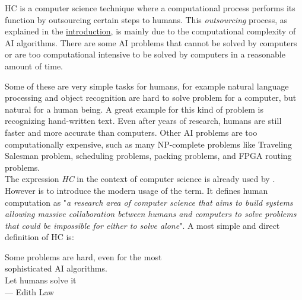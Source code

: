 
\acf{HC} is a computer science technique where a computational process
performs its function by outsourcing certain steps to humans. This
\emph{outsourcing} process, as explained in the \hyperref[intro]{introduction},
is mainly due to the computational complexity of \ac{AI} algorithms. There are
some \ac{AI} problems that cannot be solved by computers or are too computational
intensive to be solved by computers in a reasonable amount of time.

Some of these are very simple tasks for humans, for example natural language
processing and object recognition are hard to solve problem for a computer,
but natural for a human being. A great example for this kind of problem
is recognizing hand-written text. Even after years of research,
humans are still faster and more accurate than computers. Other \ac{AI} problems
are too computationally expensive, such as many NP-complete problems like
Traveling Salesman problem, scheduling problems, packing problems, and FPGA
routing problems.\\

The expression \emph{\acf{HC}} in the context of computer science is already
used by \cite{cogprints499}. However is \cite{human:comp} to introduce the modern
usage of the term. It defines human computation as "\emph{a research area of
computer science that aims to build systems allowing massive collaboration between
humans and computers to solve problems that could be impossible for either to
solve alone}". A most simple and direct definition of \ac{HC} is:
\begin{quoting}\flushright
	Some problems are hard, even for the most\\
	sophisticated AI algorithms.\\
	Let humans solve it\omissis\\
	\medskip
    {\rm --- Edith Law}
\end{quoting}



